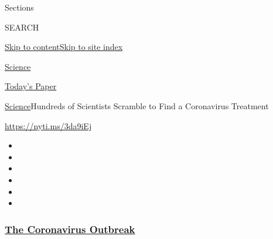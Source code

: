 Sections

SEARCH

\protect\hyperlink{site-content}{Skip to
content}\protect\hyperlink{site-index}{Skip to site index}

\href{https://www.nytimes3xbfgragh.onion/section/science}{Science}

\href{https://myaccount.nytimes3xbfgragh.onion/auth/login?response_type=cookie\&client_id=vi}{}

\href{https://www.nytimes3xbfgragh.onion/section/todayspaper}{Today's
Paper}

\href{/section/science}{Science}\textbar{}Hundreds of Scientists
Scramble to Find a Coronavirus Treatment

\url{https://nyti.ms/3da9iEj}

\begin{itemize}
\item
\item
\item
\item
\item
\item
\end{itemize}

\hypertarget{the-coronavirus-outbreak}{%
\subsubsection{\texorpdfstring{\href{https://www.nytimes3xbfgragh.onion/news-event/coronavirus?name=styln-coronavirus-national\&region=TOP_BANNER\&variant=undefined\&block=storyline_menu_recirc\&action=click\&pgtype=Article\&impression_id=31a0c330-e3b0-11ea-b605-f71bd33d99de}{The
Coronavirus
Outbreak}}{The Coronavirus Outbreak}}\label{the-coronavirus-outbreak}}

